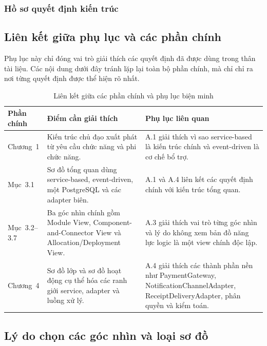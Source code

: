 \subsubsection{Hồ sơ quyết định kiến trúc}



\subsection{Liên kết giữa phụ lục và các phần chính}\label{appendix:traceability}

Phụ lục này chỉ đóng vai trò giải thích các quyết định đã được dùng trong thân tài liệu. Các nội dung dưới đây tránh lặp lại toàn bộ phần chính, mà chỉ chỉ ra nơi từng quyết định được thể hiện rõ nhất.

\begin{table}[H]
\centering
\caption{Liên kết giữa các phần chính và phụ lục biện minh}
\label{tab:appendix-traceability}
\small
\begin{tabularx}{\textwidth}{|p{3.7cm}|p{4.1cm}|X|}
\hline
\textbf{Phần chính} & \textbf{Điểm cần giải thích} & \textbf{Phụ lục liên quan} \\
\hline
Chương~1 & Kiến trúc chủ đạo xuất phát từ yêu cầu chức năng và phi chức năng. & A.1 giải thích vì sao service-based là kiến trúc chính và event-driven là cơ chế bổ trợ. \\
\hline
Mục~3.1 & Sơ đồ tổng quan dùng service-based, event-driven, một PostgreSQL và các adapter biên. & A.1 và A.4 liên kết các quyết định chính với kiến trúc tổng quan. \\
\hline
Mục~3.2--3.7 & Ba góc nhìn chính gồm Module View, Component-and-Connector View và Allocation/Deployment View. & A.3 giải thích vai trò từng góc nhìn và lý do không xem bản đồ năng lực logic là một view chính độc lập. \\
\hline
Chương~4 & Sơ đồ lớp và sơ đồ hoạt động cụ thể hóa các ranh giới service, adapter và luồng xử lý. & A.4 giải thích các thành phần nền như \textsf{PaymentGateway}, \textsf{NotificationChannelAdapter}, \textsf{ReceiptDeliveryAdapter}, phân quyền và kiểm toán. \\
\hline
\end{tabularx}
\normalsize
\end{table}

\subsection{Lý do chọn các góc nhìn và loại sơ đồ}\label{appendix:view-rationale}

